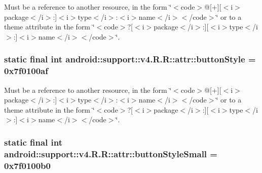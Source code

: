 Must be a reference to another resource, in the form \char`\"{}$<$code$>$@\mbox{[}+\mbox{]}\mbox{[}$<$i$>$package$<$/i$>$:\mbox{]}$<$i$>$type$<$/i$>$:$<$i$>$name$<$/i$>$$<$/code$>$\char`\"{} or to a theme attribute in the form \char`\"{}$<$code$>$?\mbox{[}$<$i$>$package$<$/i$>$:\mbox{]}\mbox{[}$<$i$>$type$<$/i$>$:\mbox{]}$<$i$>$name$<$/i$>$$<$/code$>$\char`\"{}. \hypertarget{classandroid_1_1support_1_1v4_1_1_r_1_1attr_3755dc03810850792c95e1a1e53e339c}{
\subsubsection[{buttonStyle}]{\setlength{\rightskip}{0pt plus 5cm}static final int android::support::v4.R.R::attr::buttonStyle = 0x7f0100af}}
\label{classandroid_1_1support_1_1v4_1_1_r_1_1attr_3755dc03810850792c95e1a1e53e339c}


Must be a reference to another resource, in the form \char`\"{}$<$code$>$@\mbox{[}+\mbox{]}\mbox{[}$<$i$>$package$<$/i$>$:\mbox{]}$<$i$>$type$<$/i$>$:$<$i$>$name$<$/i$>$$<$/code$>$\char`\"{} or to a theme attribute in the form \char`\"{}$<$code$>$?\mbox{[}$<$i$>$package$<$/i$>$:\mbox{]}\mbox{[}$<$i$>$type$<$/i$>$:\mbox{]}$<$i$>$name$<$/i$>$$<$/code$>$\char`\"{}. \hypertarget{classandroid_1_1support_1_1v4_1_1_r_1_1attr_a4fc8f9ca45fb006e8c99b766021f444}{
\subsubsection[{buttonStyleSmall}]{\setlength{\rightskip}{0pt plus 5cm}static final int android::support::v4.R.R::attr::buttonStyleSmall = 0x7f0100b0}}
\label{classandroid_1_1support_1_1v4_1_1_r_1_1attr_a4fc8f9ca45fb006e8c99b766021f444}



